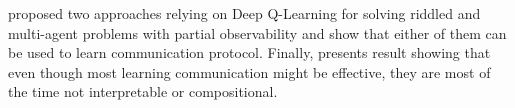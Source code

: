 \cite{foerster_learning_2016} proposed two approaches relying on Deep Q-Learning for solving riddled and multi-agent problems with partial observability and show that either of them can be used to learn communication protocol. Finally, \cite{kottur_natural_2017} presents result showing that even though most learning communication might be effective, they are most of the time not interpretable or compositional.








































